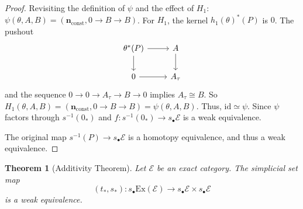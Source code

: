 \documentclass[12pt]{report}
\numberwithin{equation}{section}
\newtheorem{theorem}[dummy]{Theorem}
\begin{document}
\begin{proof}
	Revisiting the definition of $\psi$ and the effect of $H_1$:
	$\psi(\theta, A, B) = (\mathbf{n}_{\text{const}}, 0 \to B \to B)$.
	For $H_1$, the kernel $h_1(\theta)^*(P)$ is $0$. The pushout
\[\begin{tikzcd}
	{\theta^*(P)} & A \\
	0 & {A_\tau}
	\arrow[from=1-1, to=1-2]
	\arrow[from=1-1, to=2-1]
	\arrow[from=1-2, to=2-2]
	\arrow[from=2-1, to=2-2]
\end{tikzcd}\]
	and the sequence $0 \to 0 \to A_\tau \to B \to 0$ implies $A_\tau \cong B$.
	So $H_1(\theta, A, B) = (\mathbf{n}_{\text{const}}, 0 \to B \to B) = \psi(\theta, A, B)$.
	Thus, $\mathrm{id} \simeq \psi$. Since $\psi$ factors through $s^{-1}(0_*)$ and $f: s^{-1}(0_*) \to s_{\bullet}\mathcal{E}$ is a weak equivalence. 
	
	The original map $s^{-1}(P) \to s_{\bullet}\mathcal{E}$ is a homotopy equivalence, and thus a weak equivalence.
\end{proof}


\begin{theorem}[Additivity Theorem]
	\label{thm:Additivity_manual_proper_no_id_cmd_generic_label_v2}
	Let $\mathcal{E}$ be an exact category. The simplicial set map
	\[ (t_*, s_*) : s_{\bullet}\mathrm{Ex}(\mathcal{E}) \to s_{\bullet}\mathcal{E} \times s_{\bullet}\mathcal{E} \]
	is a weak equivalence.
\end{theorem}
\end{document}
